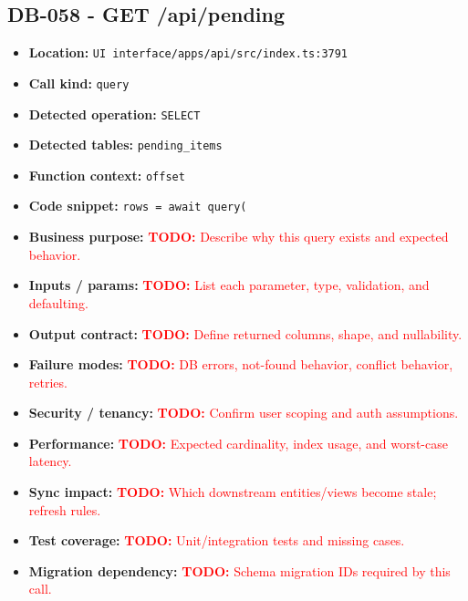 \documentclass[11pt]{article}
\newcommand{\todoitem}[1]{\textcolor{red}{\textbf{TODO:} #1}}
\begin{document}
\subsection{DB-058 - GET /api/pending}
\begin{itemize}[leftmargin=1.5em]
\item \textbf{Location:} \texttt{UI interface/apps/api/src/index.ts:3791}
\item \textbf{Call kind:} \texttt{query}
\item \textbf{Detected operation:} \texttt{SELECT}
\item \textbf{Detected tables:} \texttt{pending\_items}
\item \textbf{Function context:} \texttt{offset}
\item \textbf{Code snippet:} \texttt{rows = await query(}
\item \textbf{Business purpose:} \todoitem{Describe why this query exists and expected behavior.}
\item \textbf{Inputs / params:} \todoitem{List each parameter, type, validation, and defaulting.}
\item \textbf{Output contract:} \todoitem{Define returned columns, shape, and nullability.}
\item \textbf{Failure modes:} \todoitem{DB errors, not-found behavior, conflict behavior, retries.}
\item \textbf{Security / tenancy:} \todoitem{Confirm user scoping and auth assumptions.}
\item \textbf{Performance:} \todoitem{Expected cardinality, index usage, and worst-case latency.}
\item \textbf{Sync impact:} \todoitem{Which downstream entities/views become stale; refresh rules.}
\item \textbf{Test coverage:} \todoitem{Unit/integration tests and missing cases.}
\item \textbf{Migration dependency:} \todoitem{Schema migration IDs required by this call.}
\end{itemize}
\end{document}
